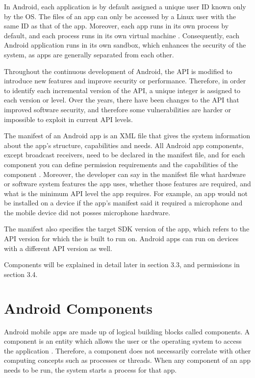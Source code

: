     In Android, each application is by default assigned a unique user ID known only by the OS. The files of an app can only be accessed by a Linux user with the same ID as that of the app. Moreover, each app runs in its own process by default, and each process runs in its own virtual machine \cite{android_app_fundamentals}. Consequently, each Android application runs in its own sandbox, which enhances the security of the system, as apps are generally separated from each other.
    
    Throughout the continuous development of Android, the API is modified to introduce new features and improve security or performance. Therefore, in order to identify each incremental version of the API, a unique integer is assigned to each version or level. Over the years, there have been changes to the API that improved software security, and therefore some vulnerabilities are harder or impossible to exploit in current API levels.
    
    The manifest of an Android app is an XML file that gives the system information about the app’s structure, capabilities and needs. All Android app components, except broadcast receivers, need to be declared in the manifest file, and for each component you can define permission requirements and the capabilities of the component \cite{android_app_fundamentals}. Moreover, the developer can say in the manifest file what hardware or software system features the app uses, whether those features are required, and what is the minimum API level the app requires. For example, an app would not be installed on a device if the app’s manifest said it required a microphone and the mobile device did not posses microphone hardware.
    
    The manifest also specifies the target SDK version of the app, which refers to the API version for which the is built to run on. Android apps can run on devices with a different API version as well.
    
    Components will be explained in detail later in section 3.3, and permissions in section 3.4.
    
    \section{Android Components}
        \label{sec:android_components}
        
    Android mobile apps are made up of logical building blocks called components. A component is an entity which allows the user or the operating system to access the application \cite{android_app_fundamentals}. Therefore, a component does not necessarily correlate with other computing concepts such as processes or threads. When any component of an app needs to be run, the system starts a process for that app.
    
